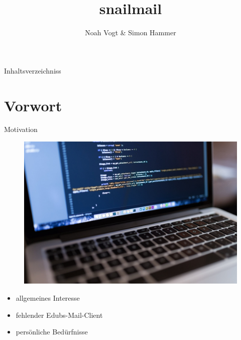 \documentclass[aspectratio=169]{beamer}
\title{snailmail}
\author{Noah Vogt \& Simon Hammer}
\institute{Gymnasium Kirschgarten}
\newlength\myheight
\newlength\mydepth
\newcommand*\inlinegraphics[1]{
    \settototalheight\myheight{Xygp}
    \settodepth\mydepth{Xygp}
    \raisebox{-\mydepth}{\texttt{[image: \#1]}}%
}
\begin{document}
\maketitle

\begin{frame}{Inhaltsverzeichniss}
    \tableofcontents
\end{frame}


\section{Vorwort}
\begin{frame}{Motivation}
\begin{varwidth}{.5\textwidth}
        \begin{figure}
            \centering
            \includegraphics[width=.9\textwidth]{media/macbook.jpg}
        \end{figure}
    \end{varwidth}
    \hfill
    \begin{varwidth}{.5\textwidth}
        \begin{itemize}\pause
            \item allgemeines Interesse\pause
            \item fehlender Edubs-Mail-Client\pause
            \item persönliche Bedürfnisse
        \end{itemize}
    \end{varwidth} 
\end{frame}
\end{document}
